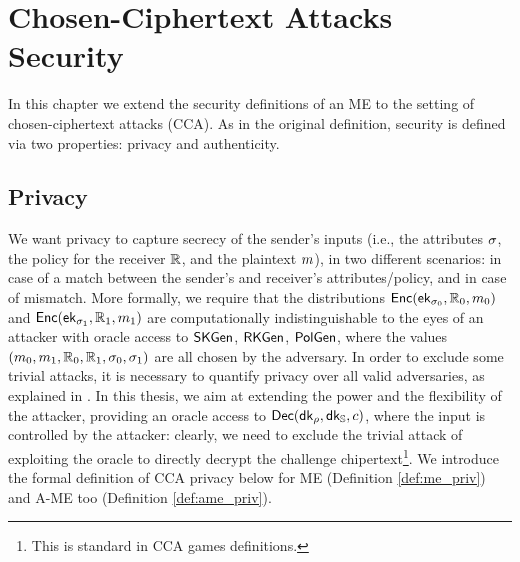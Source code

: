\chapter{Chosen-Ciphertext Attacks Security}
In this chapter we extend the security definitions of an ME to the setting of chosen-ciphertext attacks (CCA).
As in the original definition, security is defined via two properties: privacy and authenticity.

\section{Privacy}\label{sec:cca-privacy}
We want privacy to capture secrecy of the sender's inputs (i.e., the attributes $\sigma$, the policy for the receiver $\mathbb{R}$, and the plaintext $m$), in two different scenarios: in case of a match between the sender's and receiver's attributes/policy, and in case of mismatch.
More formally, we require that the distributions $\mathsf{Enc}(\mathsf{ek}_{\sigma_0}, \mathbb{R}_0, m_0)$ and $\mathsf{Enc}(\mathsf{ek}_{\sigma_1}, \mathbb{R}_1, m_1)$ are computationally indistinguishable to the eyes of an attacker with oracle access to $\mathsf{SKGen}$, $\mathsf{RKGen}$, $\mathsf{PolGen}$, where the values $(m_0, m_1,\mathbb{R}_0, \mathbb{R}_1, \sigma_0, \sigma_1)$ are all chosen by the adversary.
In order to exclude some trivial attacks, it is necessary to quantify privacy over all valid adversaries, as explained in \cite{Ateniese}.
\newline\newline
In this thesis, we aim at extending the power and the flexibility of the attacker, providing an oracle access to $\mathsf{Dec}(\mathsf{dk}_\rho, \mathsf{dk}_{\mathbb{S}}, c)$, where the input is controlled by the attacker: clearly, we need to exclude the trivial attack of exploiting the oracle to directly decrypt the challenge chipertext\footnote{This is standard in CCA games definitions.}.
We introduce the formal definition of CCA privacy below for ME (Definition \ref{def:me_priv}) and A-ME too (Definition \ref{def:ame_priv}).




